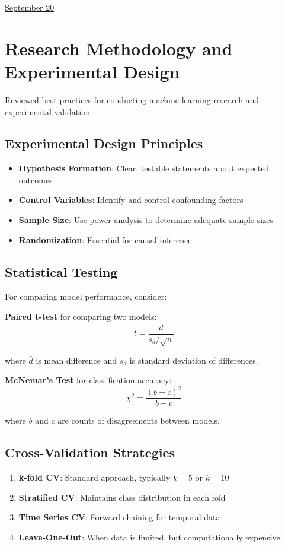 \documentclass[11pt,letterpaper]{article}
\begin{document}
\href{run:2025-09-20-research-methods.tex}{\Huge September 20} %

\section{Research Methodology and Experimental Design}

Reviewed best practices for conducting machine learning research and experimental validation.

\subsection{Experimental Design Principles}
\begin{itemize}
    \item \textbf{Hypothesis Formation}: Clear, testable statements about expected outcomes
    \item \textbf{Control Variables}: Identify and control confounding factors
    \item \textbf{Sample Size}: Use power analysis to determine adequate sample sizes
    \item \textbf{Randomization}: Essential for causal inference
\end{itemize}

\subsection{Statistical Testing}
For comparing model performance, consider:

\textbf{Paired t-test} for comparing two models:
$$t = \frac{\bar{d}}{s_d/\sqrt{n}}$$

where $\bar{d}$ is mean difference and $s_d$ is standard deviation of differences.

\textbf{McNemar's Test} for classification accuracy:
$$\chi^2 = \frac{(b - c)^2}{b + c}$$

where $b$ and $c$ are counts of disagreements between models.

\subsection{Cross-Validation Strategies}
\begin{enumerate}
    \item \textbf{k-fold CV}: Standard approach, typically $k = 5$ or $k = 10$
    \item \textbf{Stratified CV}: Maintains class distribution in each fold
    \item \textbf{Time Series CV}: Forward chaining for temporal data
    \item \textbf{Leave-One-Out}: When data is limited, but computationally expensive
\end{enumerate}
\end{document}
